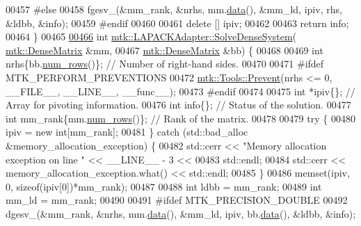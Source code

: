 \begin{DoxyCode}
00457 \textcolor{preprocessor}{  #else}
00458   fgesv\_(&mm\_rank, &nrhs, mm.\hyperlink{classmtk_1_1DenseMatrix_a0c33b8a9e01d157c61ddbdf807c25d84}{data}(), &mm\_ld, ipiv, rhs, &ldbb, &info);
00459 \textcolor{preprocessor}{  #endif}
00460 
00461   \textcolor{keyword}{delete} [] ipiv;
00462 
00463   \textcolor{keywordflow}{return} info;
00464 \}
00465 
\hypertarget{mtk__lapack__adapter_8cc_source_l00466}{}\hyperlink{classmtk_1_1LAPACKAdapter_af0723bba1d73450119d093b9cf1ff6f0}{00466} \textcolor{keywordtype}{int} \hyperlink{classmtk_1_1LAPACKAdapter_a7428bccf74fd4a4af68fb7233846da22}{mtk::LAPACKAdapter::SolveDenseSystem}(
      \hyperlink{classmtk_1_1DenseMatrix}{mtk::DenseMatrix} &mm,
00467                                          \hyperlink{classmtk_1_1DenseMatrix}{mtk::DenseMatrix} &bb) \{
00468 
00469   \textcolor{keywordtype}{int} nrhs\{bb.\hyperlink{classmtk_1_1DenseMatrix_a53f3afb3b6a8d21854458aaa9663cc74}{num\_rows}()\};  \textcolor{comment}{// Number of right-hand sides.}
00470 
00471 \textcolor{preprocessor}{  #ifdef MTK\_PERFORM\_PREVENTIONS}
00472   \hyperlink{classmtk_1_1Tools_a332324c6f25e66be9dff48c5987a3b9f}{mtk::Tools::Prevent}(nrhs <= 0, \_\_FILE\_\_, \_\_LINE\_\_, \_\_func\_\_);
00473 \textcolor{preprocessor}{  #endif}
00474 
00475   \textcolor{keywordtype}{int} *ipiv\{\};                \textcolor{comment}{// Array for pivoting information.}
00476   \textcolor{keywordtype}{int} info\{\};                 \textcolor{comment}{// Status of the solution.}
00477   \textcolor{keywordtype}{int} mm\_rank\{mm.\hyperlink{classmtk_1_1DenseMatrix_a53f3afb3b6a8d21854458aaa9663cc74}{num\_rows}()\}; \textcolor{comment}{// Rank of the matrix.}
00478 
00479   \textcolor{keywordflow}{try} \{
00480     ipiv = \textcolor{keyword}{new} \textcolor{keywordtype}{int}[mm\_rank];
00481   \} \textcolor{keywordflow}{catch} (std::bad\_alloc &memory\_allocation\_exception) \{
00482     std::cerr << \textcolor{stringliteral}{"Memory allocation exception on line "} << \_\_LINE\_\_ - 3 <<
00483       std::endl;
00484     std::cerr << memory\_allocation\_exception.what() << std::endl;
00485   \}
00486   memset(ipiv, 0, \textcolor{keyword}{sizeof}(ipiv[0])*mm\_rank);
00487 
00488   \textcolor{keywordtype}{int} ldbb = mm\_rank;
00489   \textcolor{keywordtype}{int} mm\_ld = mm\_rank;
00490 
00491 \textcolor{preprocessor}{  #ifdef MTK\_PRECISION\_DOUBLE}
00492   dgesv\_(&mm\_rank, &nrhs, mm.\hyperlink{classmtk_1_1DenseMatrix_a0c33b8a9e01d157c61ddbdf807c25d84}{data}(), &mm\_ld, ipiv, bb.\hyperlink{classmtk_1_1DenseMatrix_a0c33b8a9e01d157c61ddbdf807c25d84}{data}(), &ldbb, &info);

\end{DoxyCode}

